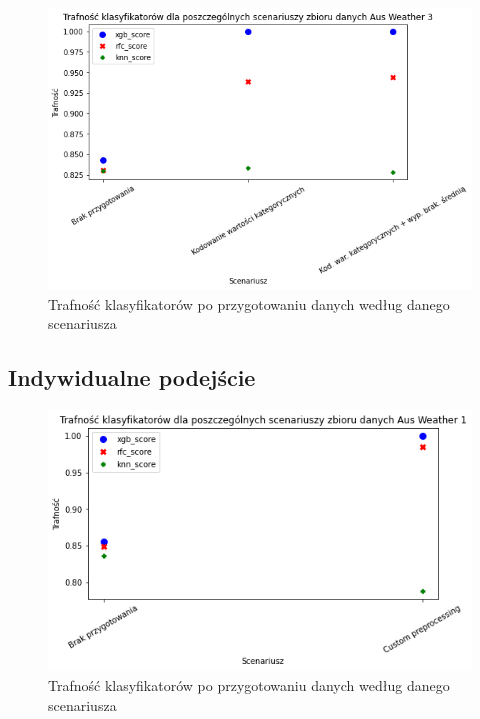 \documentclass{book}
\begin{document}
\begin{figure}[H]
\centerline{\includegraphics[scale=0.5]{Aus_Weather_3_Kodowanie}}
\centering
\caption{Trafność klasyfikatorów po przygotowaniu danych 
według danego scenariusza}
\end{figure}

\subsection{Indywidualne podejście}

\begin{figure}[H]
\centerline{\includegraphics[scale=0.5]{Aus_Weather_1_Custom}}
\centering
\caption{Trafność klasyfikatorów po przygotowaniu danych 
według danego scenariusza}
\end{figure}
\end{document}
